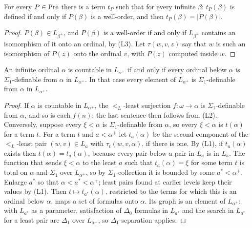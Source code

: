 \documentclass[11pt]{article}
\begin{document}
\begin{statement} For every $P \in \mathrm{Pre}$ there is a term $t_P$ such that for every infinite
$\beta$: $t_P(\beta)$ is defined if and only if $P(\beta)$ is a well-order, and then $t_P(\beta) = |P(\beta)|$.
\end{statement}

\begin{proof} $P(\beta) \in L_{\beta^+}$, and $P(\beta)$ is a well-order if and only if $L_{\beta^+}$ contains an
isomorphism of it onto an ordinal, by (L3). Let $\tau(w, v, z)$ say that $w$ is such an isomorphism of $P(z)$ onto
the ordinal $v$, with $P(z)$ computed inside $w$.
\end{proof}

\begin{statement} An infinite ordinal $\alpha$ is countable in $L_{\alpha^+}$ if and only if every
ordinal below $\alpha$ is $\Sigma_1$-definable from $\alpha$ in $L_{\alpha^+}$. In that case every element of
$L_{\alpha^+}$ is $\Sigma_1$-definable from $\alpha$ in $L_{\alpha^+}$.
\end{statement}

\begin{proof} If $\alpha$ is countable in $L_{\alpha^+}$, the $<_L$-least surjection $f : \omega \to \alpha$ is
$\Sigma_1$-definable from $\alpha$, and so is each $f(n)$; the last sentence then follows from (L2). Conversely,
suppose every $\xi < \alpha$ is $\Sigma_1$-definable from $\alpha$, so every $\xi < \alpha$ is $t(\alpha)$ for a
term $t$. For a term $t$ and $a < \alpha^+$ let $t_a(\alpha)$ be the second component of the $<_L$-least pair
$(w, v) \in L_a$ with $\tau_t(w, v, \alpha)$, if there is one. By (L1), if $t_a(\alpha)$ exists then
$t(\alpha) = t_a(\alpha)$, because every pair below a pair in $L_a$ is in $L_a$. The function that sends
$\xi < \alpha$ to the least $a$ such that $t_a(\alpha) = \xi$ for some term $t$ is total on $\alpha$ and $\Sigma_1$
over $L_{\alpha^+}$, so by $\Sigma_1$-collection it is bounded by some $a^* < \alpha^+$. Enlarge $a^*$ so that
$\alpha < a^* < \alpha^+$; least pairs found at earlier levels keep their values by (L1). Then
$t \mapsto t_{a^*}(\alpha)$, restricted to the terms for which this is an ordinal below $\alpha$, maps a set of
formulas onto $\alpha$. Its graph is an element of $L_{\alpha^+}$: with $L_{a^*}$ as a parameter, satisfaction of
$\Delta_0$ formulas in $L_{a^*}$ and the search in $L_{a^*}$ for a least pair are $\Delta_1$ over $L_{\alpha^+}$, so
$\Delta_1$-separation applies.
\end{proof}
\end{document}

